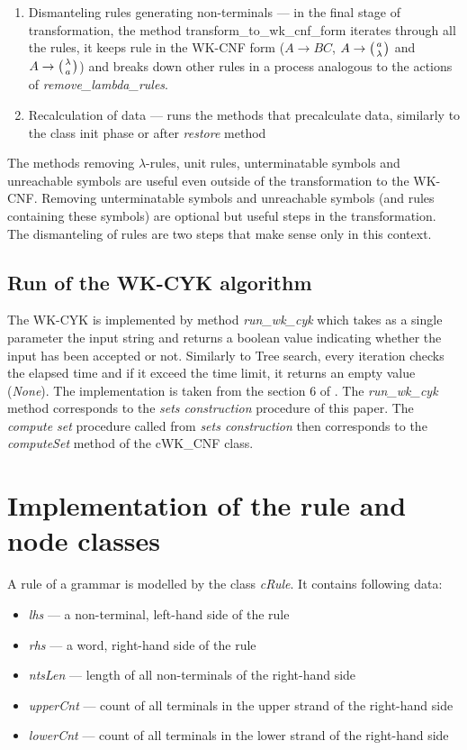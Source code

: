 \begin{enumerate}
  \item{Dismanteling rules generating non-terminals --- in the final stage of transformation, the method transform\_to\_wk\_cnf\_form} iterates through all the rules, it keeps rule in the WK-CNF form ($A \rightarrow BC$, $A \rightarrow \wkpair{a}{\lambda}$ and $A \rightarrow \wkpair{\lambda}{a}$) and breaks down other rules in a process analogous to the actions of \textit{remove\_lambda\_rules}.

  \item{Recalculation of data --- runs the methods that precalculate data, similarly to the class init phase or after \textit{restore} method}
\end{enumerate}

The methods removing $\lambda$-rules, unit rules, unterminatable symbols and unreachable symbols are useful even outside of the transformation to the WK-CNF. Removing unterminatable symbols and unreachable symbols (and rules containing these symbols) are optional but useful steps in the transformation. The dismanteling of rules are two steps that make sense only in this context.


\subsection{Run of the WK-CYK algorithm}
The WK-CYK is implemented by method \textit{run\_wk\_cyk} which takes as a single parameter the input string and returns a boolean value indicating whether the input has been accepted or not. Similarly to Tree search, every iteration checks the elapsed time and if it exceed the time limit, it returns an empty value (\textit{None}). The implementation is taken from the section 6 of \cite{WK_CYK}. The \textit{run\_wk\_cyk} method corresponds to the \textit{sets construction} procedure of this paper. The \textit{compute set} procedure called from \textit{sets construction} then corresponds to the \textit{computeSet} method of the cWK\_CNF class.


\section{Implementation of the rule and node classes}
A rule of a grammar is modelled by the class \textit{cRule}. It contains following data:
\begin{itemize}
  \item{\textit{lhs} --- a non-terminal, left-hand side of the rule}
  \item{\textit{rhs} --- a word, right-hand side of the rule}
  \item{\textit{ntsLen} --- length of all non-terminals of the right-hand side}
  \item{\textit{upperCnt} --- count of all terminals in the upper strand of the right-hand side}
  \item{\textit{lowerCnt} --- count of all terminals in the lower strand of the right-hand side}
\end{itemize}

